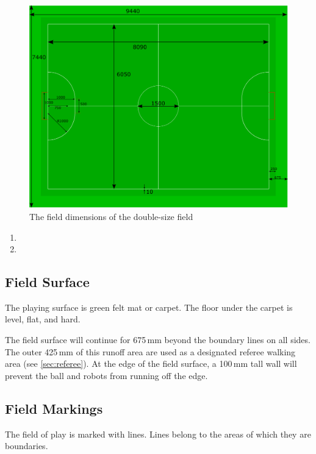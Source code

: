 \begin{figure}[ht] %
	\centering
	\includegraphics[width=0.8\columnwidth]{img/double-size-field.png}
	\caption{The field dimensions of the double-size field}
	\label{fig:double_size_field}
\end{figure}

\begin{enumerate}
\item {}
\item {}
\end{enumerate}

\subsection{Field Surface}
The playing surface is green felt mat or carpet.
The floor under the carpet is level, flat, and hard.

The field surface will continue for 675\,mm beyond the boundary lines on all sides.
The outer 425\,mm of this runoff area are used as a designated referee walking area (see \autoref{sec:referee}).
At the edge of the field surface, a 100\,mm tall wall will prevent the ball and robots from running off the edge.

\subsection{Field Markings}
The field of play is marked with lines.
Lines belong to the areas of which they are boundaries.

